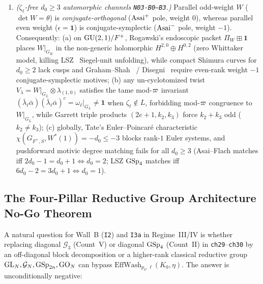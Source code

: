 \begin{theorem}
\begin{enumerate}[label=\textup{(\roman*)}]
\item \emph{($\zeta_\ell$-free $d_0 \ge 3$ automorphic channels \texttt{N03-B0--B3}.)} Parallel odd-weight $W$ ($\det W = \theta$) is \emph{conjugate-orthogonal} ($\mathrm{Asai}^+$ pole, weight $0$), whereas parallel even weight ($\epsilon = \mathbf{1}$) is conjugate-symplectic ($\mathrm{Asai}^-$ pole, weight $-1$). Consequently: \textup{(a)} on $\mathrm{GU}(2,1)/F^+$, Rogawski's endoscopic packet $\Pi_W \boxplus \mathbf{1}$ places $W|_{G_K}$ in the non-generic holomorphic $H^{2,0}\oplus H^{0,2}$ (zero Whittaker model, killing LSZ~\cite{LSZ2022} Siegel-unit unfolding), while compact Shimura curves for $d_0 \ge 2$ lack cusps and Graham--Shah~\cite{GS2023} / Disegni~\cite{Disegni2024} require even-rank weight $-1$ conjugate-symplectic motives; \textup{(b)} any un-cyclotomized twist $V_\lambda = W|_{G_L}\otimes \lambda_{(1,0)}$ satisfies the tame mod-$\varpi$ invariant $(\bar\lambda_\ell\bar\alpha)(\bar\lambda_\ell\bar\alpha)^c = \omega_\ell|_{G_L} \neq \mathbf{1}$ when $\zeta_\ell \notin L$, forbidding mod-$\varpi$ congruence to $W|_{G_L}$, while Garrett triple products $(2e+1, k_2, k_3)$ force $k_2 + k_3$ odd ($k_2 \neq k_3$); \textup{(c)} globally, Tate's Euler--Poincar\'e characteristic $\chi(G_{F^+, S}, W^*(1)) = -d_0 \le -3$ blocks rank-$1$ Euler systems, and pushforward motivic degree matching fails for all $d_0 \ge 3$ (Asai--Flach matches iff $2d_0 - 1 = d_0 + 1 \iff d_0 = 2$; LSZ $\mathrm{GSp}_4$ matches iff $6d_0 - 2 = 3d_0 + 1 \iff d_0 = 1$).
\end{enumerate}
\end{theorem}

\subsection{The Four-Pillar Reductive Group Architecture No-Go Theorem}\label{sec:5:nogo}

A natural question for Wall~B (\texttt{I2}) and \texttt{I3a} in Regime~III/IV is whether replacing diagonal $\mathcal{G}_3$ (Count~V) or diagonal $\mathrm{GSp}_4$ (Count~II) in \texttt{ch29}--\texttt{ch30} by an off-diagonal block decomposition or a higher-rank classical reductive group $\mathrm{GL}_N, \mathcal{G}_N, \mathrm{GSp}_{2n}, \mathrm{GO}_N$ can bypass $\mathrm{EffWash}_{p_0,\ell}(K_0, \eta)$. The answer is unconditionally negative:

